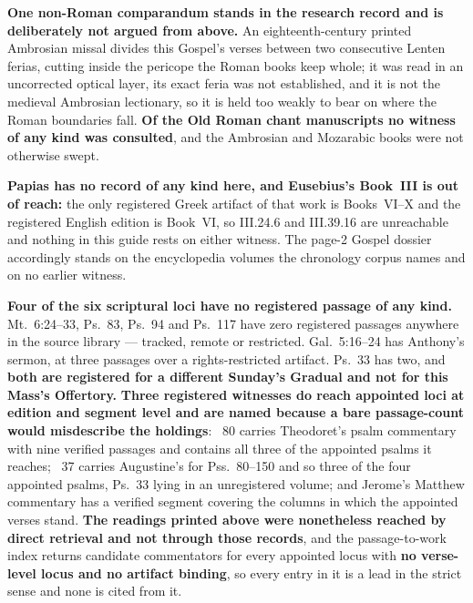 \textbf{One non-Roman comparandum stands in the research record and is
deliberately not argued from above.} An eighteenth-century printed Ambrosian
missal divides this Gospel's verses between two consecutive Lenten ferias,
cutting inside the pericope the Roman books keep whole; it was read in an
uncorrected optical layer, its exact feria was not established, and it is not
the medieval Ambrosian lectionary, so it is held too weakly to bear on where the
Roman boundaries fall. \textbf{Of the
Old Roman chant manuscripts no witness of any kind was consulted}, and the
Ambrosian and Mozarabic books were not otherwise swept.

\textbf{Papias has no record of any kind here, and Eusebius's  Book~III is out of reach:} the only registered Greek artifact of
that work is Books~VI--X and the registered English edition is Book~VI, so
III.24.6 and III.39.16 are unreachable and nothing in this guide rests on
either witness. The page-2 Gospel dossier accordingly stands on the encyclopedia
volumes the chronology corpus names and on no earlier witness.

\textbf{Four of the six scriptural loci have no registered passage of any kind.}
Mt.\ 6:24--33, Ps.~83, Ps.~94 and Ps.~117 have zero registered passages anywhere
in the source library --- tracked, remote or restricted. Gal.\ 5:16--24 has
Anthony's sermon, at three passages over a rights-restricted artifact. Ps.~33
has two, and \textbf{both are registered for a different Sunday's Gradual and
not for this Mass's Offertory.} \textbf{Three registered witnesses do reach
appointed loci at edition and segment level and are named because a bare
passage-count would misdescribe the holdings}: ~80
carries Theodoret's psalm commentary with nine verified passages and contains
all three of the appointed psalms it reaches; ~37
carries Augustine's  for Pss.~80--150 and so three of the
four appointed psalms, Ps.~33 lying in an unregistered volume; and Jerome's
Matthew commentary has a verified segment covering the columns in which the
appointed verses stand. \textbf{The readings printed above were nonetheless
reached by direct retrieval and not through those records}, and the
passage-to-work index returns candidate commentators for every appointed locus
with \textbf{no verse-level locus and no artifact binding}, so every entry in it
is a lead in the strict sense and none is cited from it.

